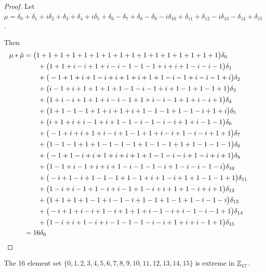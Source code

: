  
\begin{proof}
Let  $\mu =  \delta_{0}+\delta_{1}+i\delta_{2}+\delta_{3}+\delta_{4}+i\delta_{5}+\delta_{6}-\delta_{7}+\delta_{8}-\delta_{9}-i\delta_{10}+\delta_{11}+\delta_{12}-i\delta_{13}-\delta_{14}+\delta_{15}
$.  

Then 
\begin{align*} 
\mu * \tilde \mu & = \big(1+1+1+1+1+1+1+1+1+1+1+1+1+1+1+1\big)\delta_{0}
\\&\qquad
+\big(1+1+i-i+1+i-i-1-1-1+i+i+1-i-i-1\big)\delta_{1}
\\&\qquad
+\big(-1+1+i+1-i+i+1+i+1+1-i-1+i-i-1+i\big)\delta_{2}
\\&\qquad
+\big(i-1+i+1+1+1+1-1-i-1+i+1-1+1-1+1\big)\delta_{3}
\\&\qquad
+\big(1+i-i+1+1+i-i-1+1+i-i-1+1+i-i+1\big)\delta_{4}
\\&\qquad
+\big(1+1-1-1+1+i+1+i+1-1-1+1-1-i+1+i\big)\delta_{5}
\\&\qquad
+\big(i+1+i+i-1+i+1-1-i-1-i-i+1+i-1-1\big)\delta_{6}
\\&\qquad
+\big(-1+i+i+1+i-i+1-1+1+i-i+1-i-i+1+1\big)\delta_{7}
\\&\qquad
+\big(1-1-1+1+1-1-1-1+1-1-1+1+1-1-1-1\big)\delta_{8}
\\&\qquad
+\big(-1+1-i+i+1+i+i+1+1-1-i-i+1-i+i+1\big)\delta_{9}
\\&\qquad
+\big(1-1+i-1+i+i+1-i-1-1-i+1-i-i-1-i\big)\delta_{10}
\\&\qquad
+\big(-i+1-i+1-1-1+1-1+i+1-i+1+1-1-1+1\big)\delta_{11}
\\&\qquad
+\big(1-i+i-1+1-i+i-1+1-i+i+1+1-i+i+1\big)\delta_{12}
\\&\qquad
+\big(1+1+1+1-1+i-1-i+1-1+1-1+1-i-1-i\big)\delta_{13}
\\&\qquad
+\big(-i+1+i-i+1-i+1+1+i-1-i+i-1-i-1+1\big)\delta_{14}
\\&\qquad
+\big(1-i+i+1-i+i-1-1-1-i-i+1+i+i-1+1\big)\delta_{15}\\&=16\delta_{0 }\qedhere
\end{align*}
\end{proof}



\begin{prop}\label{prop16inZ17}
The 16 element set $\{0,  1,  2,  3,  4,  5,  6,  7,  8,  9,  10,  11,  12,  13,  14,  15 \}$ is extreme in $ \texttt{$\mathbb Z_{17}^{\,}$}$. \newline \end{prop} 


